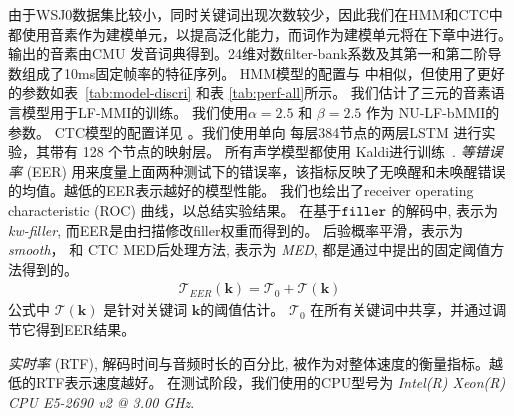 由于WSJ0数据集比较小，同时关键词出现次数较少，因此我们在HMM和CTC中都使用音素作为建模单元，以提高泛化能力，而词作为建模单元将在下章中进行。
输出的音素由CMU 发音词典得到。24维对数filter-bank系数及其第一和第二阶导数组成了10ms固定帧率的特征序列。
HMM模型的配置与 \cite{povey2016purely}中相似，但使用了更好的参数如表~\ref{tab:model-discri} 和表 \ref{tab:perf-all}所示。 我们估计了三元的音素语言模型用于LF-MMI的训练。
我们使用$\alpha=2.5$ 和 $\beta=2.5$ 作为 NU-LF-bMMI的参数。
CTC模型的配置详见 \cite{7736093}。我们使用单向 每层384节点的两层LSTM 进行实验，其带有 128 个节点的映射层。
所有声学模型都使用 Kaldi进行训练~\cite{povey2011kaldi}.
 {\em 等错误率} (EER) 用来度量上面两种测试下的错误率，该指标反映了无唤醒和未唤醒错误的均值。越低的EER表示越好的模型性能。
我们也绘出了receiver operating characteristic (ROC) 曲线，以总结实验结果。
在基于$\tt filler$ 的解码中, 表示为 {\em{kw-filler}}, 而EER是由扫描修改filler权重而得到的。
后验概率平滑，表示为 {\em{smooth}}， 和 CTC MED后处理方法, 表示为 {\em{MED}}, 都是通过\cite{7736093}中提出的固定阈值方法得到的。
\begin{equation}
\label{equ:eer-thres}
\begin{split}
\mathcal T_{EER}(\mathbf{k})=\mathcal T_0+\mathcal T(\mathbf{k})
\end{split}
\end{equation}
公式中 $\mathcal T(\mathbf{k})$ 是针对关键词 $\mathbf{k}$的阈值估计。 $\mathcal T_0$ 在所有关键词中共享，并通过调节它得到EER结果。

{\em 实时率} (RTF), 解码时间与音频时长的百分比, 被作为对整体速度的衡量指标。越低的RTF表示速度越好。
在测试阶段，我们使用的CPU型号为
{\em{Intel(R) Xeon(R) CPU E5-2690 v2 @ 3.00 GHz}}. 

